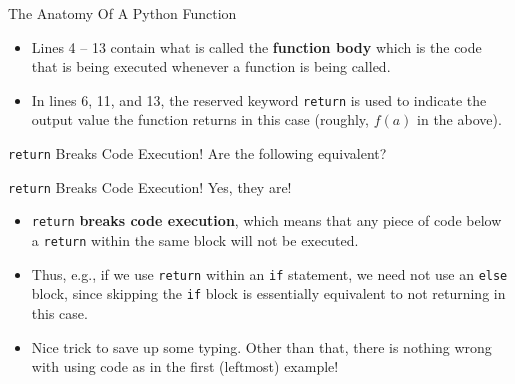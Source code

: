 \documentclass[aspectratio=169, 12pt, xcolor=table]{beamer}
\begin{document}
	\begin{frame}{The Anatomy Of A Python Function}
		\begin{minipage}[t]{0.5\textwidth}
			\vspace{0pt}
			\begin{itemize}
				\item Lines 4 -- 13 contain what is called the \textbf{function body} which is the code that is being executed whenever a function is being called.
				\item In lines 6, 11, and 13, the reserved keyword \texttt{return} is used to indicate the output value the function returns in this case (roughly, $f(a)$ in the above).
			\end{itemize}
		\end{minipage}\hfill
		\begin{minipage}[t]{0.45\textwidth}
			\vspace{0pt}
			
		\end{minipage}
	\end{frame}

	\begin{frame}{\texttt{return} Breaks Code Execution!}
		Are the following equivalent?
		
		\begin{minipage}[t]{0.45\textwidth}
			\vspace{0pt}
			
		\end{minipage}\hfill
		\begin{minipage}[t]{0.45\textwidth}
			\vspace{0pt}
			
		\end{minipage}
	\end{frame}

	\begin{frame}{\texttt{return} Breaks Code Execution!}
		Yes, they are!
		\begin{itemize}
			\item \texttt{return} \textbf{breaks code execution}, which means that any piece of code below a \texttt{return} within the same block will not be executed.
			\item Thus, e.g., if we use \texttt{return} within an \texttt{if} statement, we need not use an \texttt{else} block, since skipping the \texttt{if} block is essentially equivalent to not returning in this case.
			\item Nice trick to save up some typing. Other than that, there is nothing wrong with using code as in the first (leftmost) example!
		\end{itemize}
	\end{frame}
\end{document}
